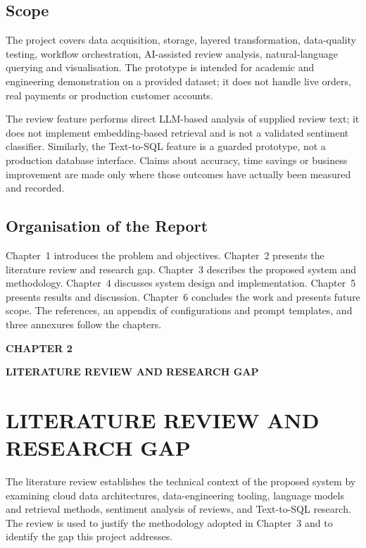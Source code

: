 \documentclass[12pt,a4paper]{report}
\newcommand{\chaptersplit}[2]{%
  \clearpage
  \thispagestyle{empty}%
  \vspace*{\fill}
  \begin{center}
    {\fontsize{16}{20}\selectfont\bfseries CHAPTER #1\par}
    \vspace{1.2cm}
    {\fontsize{16}{20}\selectfont\bfseries #2\par}
  \end{center}
  \vspace*{\fill}
  \clearpage
}
\begin{document}
\section{Scope}
The project covers data acquisition, storage, layered transformation, data-quality testing, workflow orchestration, AI-assisted review analysis, natural-language querying and visualisation. The prototype is intended for academic and engineering demonstration on a provided dataset; it does not handle live orders, real payments or production customer accounts.

The review feature performs direct LLM-based analysis of supplied review text; it does not implement embedding-based retrieval and is not a validated sentiment classifier. Similarly, the Text-to-SQL feature is a guarded prototype, not a production database interface. Claims about accuracy, time savings or business improvement are made only where those outcomes have actually been measured and recorded.

\section{Organisation of the Report}
Chapter~1 introduces the problem and objectives. Chapter~2 presents the literature review and research gap. Chapter~3 describes the proposed system and methodology. Chapter~4 discusses system design and implementation. Chapter~5 presents results and discussion. Chapter~6 concludes the work and presents future scope. The references, an appendix of configurations and prompt templates, and three annexures follow the chapters.

\chaptersplit{2}{LITERATURE REVIEW AND RESEARCH GAP}

\chapter{LITERATURE REVIEW AND RESEARCH GAP}

\noindent The literature review establishes the technical context of the proposed system by examining cloud data architectures, data-engineering tooling, language models and retrieval methods, sentiment analysis of reviews, and Text-to-SQL research. The review is used to justify the methodology adopted in Chapter~3 and to identify the gap this project addresses.
\end{document}
